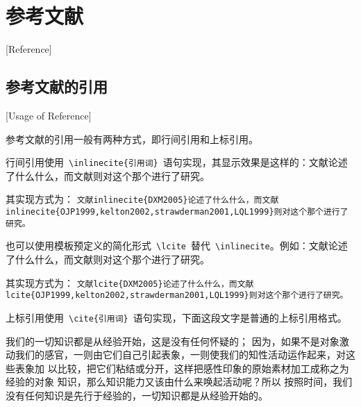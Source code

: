 
%
%
%

\chapter{参考文献}[Reference]
\label{chap07}

\section{参考文献的引用}[Usage of Reference]

参考文献的引用一般有两种方式，即行间引用和上标引用。

行间引用使用~\verb|\inlinecite{引用词}|~语句实现，其显示效果是这样的：文献论述了什么什么，而文献则对这个那个进行了研究。

其实现方式为：
\texttt{文献\cs inlinecite\{DXM2005\}论述了什么什么，而文献\cs inlinecite\{OJP1999,kelton2002,strawderman2001,LQL1999\}则对这个那个进行了研究。}

也可以使用模板预定义的简化形式~\verb|\lcite|~替代~\verb|\inlinecite|。例如：文献论述了什么什么，而文献则对这个那个进行了研究。

其实现方式为：
\texttt{文献\cs lcite\{DXM2005\}论述了什么什么，而文献\cs lcite\{OJP1999,kelton2002,strawderman2001,LQL1999\}则对这个那个进行了研究。}

上标引用使用~\verb|\cite{引用词}|~语句实现，下面这段文字是普通的上标引用格式。

我们的一切知识都是从经验开始\cite{LQL1999}，这是没有任何怀疑的\cite{DXM2005}\cite{DXM2000}；
因为，如果不是对象激动我们的感官，一则由它们自己引起表象，一则使我们的知性活动运作起来，对这些表象加
以比较，把它们粘结或分开\cite{OJP1999,OJP1991}，这样把感性印象的原始素材加工成称之为经验的对象
知识，那么知识能力又该由什么来唤起活动呢\cite{braun2007,kelton2002,strawderman2001,LQL1999}？所以
按照时间，我们没有任何知识是先行于经验的，一切知识都是从经验开始的。

